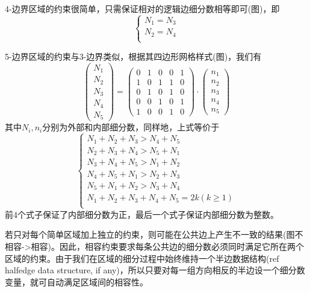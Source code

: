  4-边界区域的约束很简单，只需保证相对的逻辑边细分数相等即可(图)，即
 \begin{equation}\label{equ:4side}
\begin{cases}
N_1=N_3\\
N_2=N_4\\
\end{cases}
 \end{equation}
 
 5-边界区域的约束与3-边界类似，根据其四边形网格样式(图)，我们有
 \begin{equation}
 \left(
 \begin{array}{c}
 N_1 \\ 
 N_2 \\ 
 N_3 \\
 N_4 \\
 N_5
 \end{array}
 \right) 
 =
 \left(
 \begin{array}{ccccc}
 0 & 1 & 0 & 0 & 1 \\ 
 1 & 0 & 1 & 1 & 0 \\ 
 0 & 1 & 0 & 1 & 0 \\ 
 0 & 0 & 1 & 0 & 1 \\ 
 1 & 0 & 0 & 1 & 0
 \end{array} 
 \right)
 \cdot
 \left(
 \begin{array}{c}
 n_1 \\ 
 n_2 \\ 
 n_3 \\ 
 n_4 \\
 n_5 
 \end{array} 
 \right)
 \end{equation}
 其中$N_i,n_i$分别为外部和内部细分数，同样地，上式等价于
 \begin{equation}        \label{equ:5side}                  
 \begin{cases}
 N_1+N_2+N_3 > N_4+N_5\\
N_2+N_3+N_4 > N_5+N_1\\
 N_3+N_4+N_5 > N_1+N_2\\
N_4+N_5+N_1 > N_2+N_3\\
N_5+N_1+N_2 > N_3+N_4\\
N_1+N_2+N_3+N_4+N_5=2k(k\geq 1)\\
 \end{cases}
 \end{equation}
 前4个式子保证了内部细分数为正，最后一个式子保证内部细分数为整数。
 
若只对每个简单区域加上独立的约束，则可能在公共边上产生不一致的结果(图不相容->相容)。因此，相容约束要求每条公共边的细分数必须同时满足它所在两个区域的约束。由于我们在区域的细分过程中始终维持一个半边数据结构(ref halfedge data structure, if any)，所以只要对每一组方向相反的半边设一个细分数变量，就可自动满足区域间的相容性。

